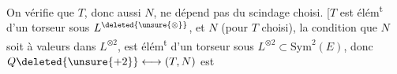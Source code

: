  On vérifie que $T$, donc aussi $N$, ne dépend pas du scindage choisi. [$T$ est élém\textsuperscript{t} d'un torseur  sous $L^{\deleted{\unsure{\otimes}}}$,  et $N$ (pour $T$ choisi),  la condition que $N$ soit à valeurs dans $L^{\otimes2}$, est élém\textsuperscript{t} d'un torseur sous $L^{\otimes2}\subset\mathrm{Sym}^2(E)$, donc  $Q\deleted{\unsure{+2}}\longleftrightarrow(T,N)$ est 
